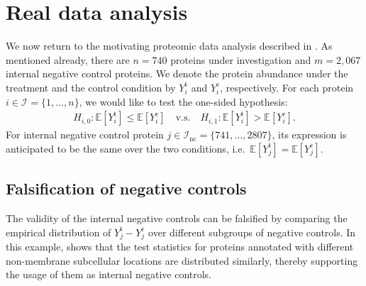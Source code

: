 \documentclass[a4paper,11pt]{article}
\theoremstyle{plain}
\theoremstyle{definition}
\def\EE{\mathbb{E}}
\def\calI{\mathcal{I}}
\theoremstyle{plain}
\newcommand{\No}{{n}}
\newcommand{\NoNc}{m}
\newcommand{\nickname}{{\text{RANC}}}
\newcommand{\hypothesis}[1]{{H_{#1}}}
\newcommand{\hypothesisIndex}[1]{{\calI_{#1}}}
\newcommand{\responseTreatment}[1]{{Y_{#1}^{\text{t}}}}
\newcommand{\responseControl}[1]{{Y_{#1}^{\text{c}}}}
\newcommand{\BH}{{\text{BH}}}
\begin{document}
\section{Real data analysis}\label{sec:real.data}

We now return to the motivating proteomic data analysis described in
. As mentioned already, there are $\No =
740$ proteins under investigation and $\NoNc = 2,067$ internal
negative control proteins.
We denote the protein abundance under the treatment and the control
condition by $\responseTreatment{i}$ and $\responseControl{i}$,
respectively.
For each protein $i \in \hypothesisIndex{} = \{1,\dotsc,\No\}$, we would
like to test the one-sided hypothesis:
\begin{align*}
    \hypothesis{i,0}: \EE[\responseTreatment{i}] \le  \EE[\responseControl{i}] \quad \text{v.s.} \quad \hypothesis{i,1}: \EE[\responseTreatment{i}] >  \EE[\responseControl{i}].
\end{align*}
For internal negative control protein $j \in
\hypothesisIndex{\text{nc}} = \{741, \dotsc, 2807\}$, its expression
is anticipated to be the same over the two conditions, i.e.\
$\EE[\responseTreatment{j}] =  \EE[\responseControl{j}]$.

\subsection{Falsification of negative controls}
\label{sec:fals-negat-contr}

The validity of the internal negative controls can be falsified by
comparing the empirical distribution of $\responseTreatment{j} -
\responseControl{j}$ over different subgroups of negative controls.
In this example, \Cref{fig:nc.subgroup} shows that the test statistics
for proteins annotated with different non-membrane subcellular
locations are distributed similarly, thereby supporting the usage of
them as internal negative controls.
\end{document}
